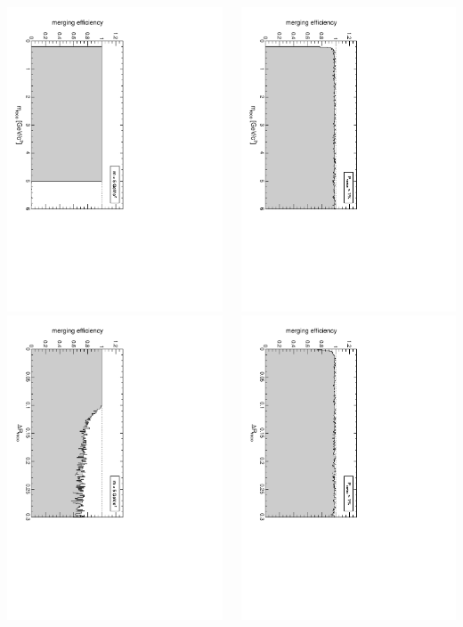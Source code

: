 \documentclass[compress]{beamer}
\begin{document}
\begin{frame}
\begin{columns}
\includegraphics[height=0.5\linewidth, angle=90]{mergingeff_recomass_GroupByMass.pdf}
\includegraphics[height=0.5\linewidth, angle=90]{mergingeff_recodr_GroupByMass.pdf}

\includegraphics[height=0.5\linewidth, angle=90]{mergingeff_recomass_GroupByVertexProb.pdf}
\includegraphics[height=0.5\linewidth, angle=90]{mergingeff_recodr_GroupByVertexProb.pdf}


\end{columns}
\end{frame}
\end{document}
